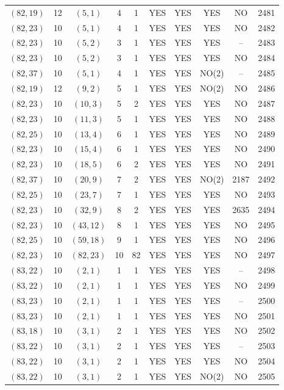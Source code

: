 \begin{longtable}{|c|c|c|c|c|c|c|c|c|c|}
$(82, 19)$ & 12 & $(5, 1)$ & 4 & 1 & YES & YES & YES & NO & 2481\\
$(82, 23)$ & 10 & $(5, 1)$ & 4 & 1 & YES & YES & YES & NO & 2482\\
$(82, 23)$ & 10 & $(5, 2)$ & 3 & 1 & YES & YES & YES & -- & 2483\\
$(82, 23)$ & 10 & $(5, 2)$ & 3 & 1 & YES & YES & YES & NO & 2484\\
$(82, 37)$ & 10 & $(5, 1)$ & 4 & 1 & YES & YES & NO(2) & -- & 2485\\
$(82, 19)$ & 12 & $(9, 2)$ & 5 & 1 & YES & YES & NO(2) & NO & 2486\\
$(82, 23)$ & 10 & $(10, 3)$ & 5 & 2 & YES & YES & YES & NO & 2487\\
$(82, 23)$ & 10 & $(11, 3)$ & 5 & 1 & YES & YES & YES & NO & 2488\\
$(82, 25)$ & 10 & $(13, 4)$ & 6 & 1 & YES & YES & YES & NO & 2489\\
$(82, 23)$ & 10 & $(15, 4)$ & 6 & 1 & YES & YES & YES & NO & 2490\\
$(82, 23)$ & 10 & $(18, 5)$ & 6 & 2 & YES & YES & YES & NO & 2491\\
$(82, 37)$ & 10 & $(20, 9)$ & 7 & 2 & YES & YES & NO(2) & 2187 & 2492\\
$(82, 25)$ & 10 & $(23, 7)$ & 7 & 1 & YES & YES & YES & NO & 2493\\
$(82, 23)$ & 10 & $(32, 9)$ & 8 & 2 & YES & YES & YES & 2635 & 2494\\
$(82, 23)$ & 10 & $(43, 12)$ & 8 & 1 & YES & YES & YES & NO & 2495\\
$(82, 25)$ & 10 & $(59, 18)$ & 9 & 1 & YES & YES & YES & NO & 2496\\
$(82, 23)$ & 10 & $(82, 23)$ & 10 & 82 & YES & YES & YES & NO & 2497\\
$(83, 22)$ & 10 & $(2, 1)$ & 1 & 1 & YES & YES & YES & -- & 2498\\
$(83, 22)$ & 10 & $(2, 1)$ & 1 & 1 & YES & YES & YES & NO & 2499\\
$(83, 23)$ & 10 & $(2, 1)$ & 1 & 1 & YES & YES & YES & -- & 2500\\
$(83, 23)$ & 10 & $(2, 1)$ & 1 & 1 & YES & YES & YES & NO & 2501\\
$(83, 18)$ & 10 & $(3, 1)$ & 2 & 1 & YES & YES & YES & NO & 2502\\
$(83, 22)$ & 10 & $(3, 1)$ & 2 & 1 & YES & YES & YES & -- & 2503\\
$(83, 22)$ & 10 & $(3, 1)$ & 2 & 1 & YES & YES & YES & NO & 2504\\
$(83, 22)$ & 10 & $(3, 1)$ & 2 & 1 & YES & YES & NO(2) & NO & 2505\\

\end{longtable}

